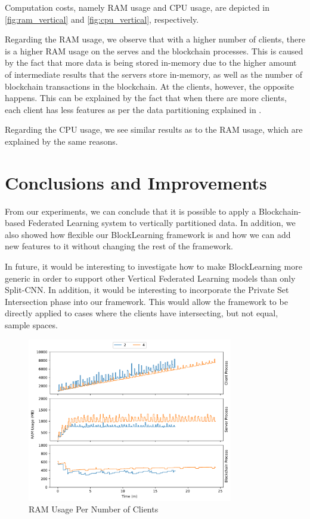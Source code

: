Computation costs, namely RAM usage and CPU usage, are depicted in \autoref{fig:ram_vertical} and \autoref{fig:cpu_vertical}, respectively.

Regarding the RAM usage, we observe that with a higher number of clients, there is a higher RAM usage on the serves and the blockchain processes. This is caused by the fact that more data is being stored in-memory due to the higher amount of intermediate results that the servers store in-memory, as well as the number of blockchain transactions in the blockchain. At the clients, however, the opposite happens. This can be explained by the fact that when there are more clients, each client has less features as per the data partitioning explained in .

Regarding the CPU usage, we see similar results as to the RAM usage, which are explained by the same reasons.

\section{Conclusions and Improvements}

From our experiments, we can conclude that it is possible to apply a Blockchain-based Federated Learning system to vertically partitioned data. In addition, we also showed how flexible our BlockLearning framework is and how we can add new features to it without changing the rest of the framework.

In future, it would be interesting to investigate how to make BlockLearning more generic in order to support other Vertical Federated Learning models than only Split-CNN. In addition, it would be interesting to incorporate the Private Set Intersection phase into our framework. This would allow the framework to be directly applied to cases where the clients have intersecting, but not equal, sample spaces.

\clearpage

\begin{figure}[!hpt]
    \centering
    \centering
    \includegraphics[width=0.8\textwidth]{graphics/vertical/ram.pdf}
    \caption{RAM Usage Per Number of Clients}
    \label{fig:ram_vertical}
\end{figure}

